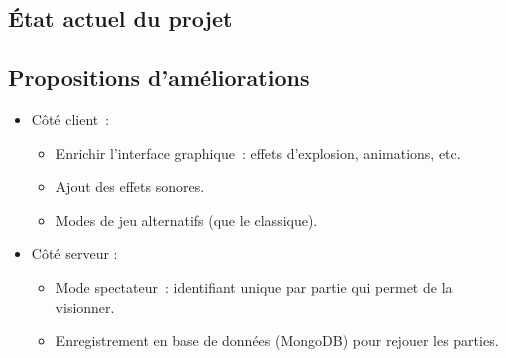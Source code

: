 \documentclass[a4paper, 11pt]{article}
\begin{document}
\subsection{État actuel du projet}
\subsection{Propositions d'améliorations}
\begin{itemize}
	\item Côté client :
	\begin{itemize}
		\item Enrichir l’interface graphique : effets d’explosion, animations, etc.
		\item Ajout des effets sonores.
		\item Modes de jeu alternatifs (que le classique).
	\end{itemize}
	\item Côté serveur :
	\begin{itemize}
		\item Mode spectateur : identifiant unique par partie qui permet de la visionner.
		\item Enregistrement en base de données (MongoDB) pour rejouer les parties.
	\end{itemize}
\end{itemize}
\end{document}
